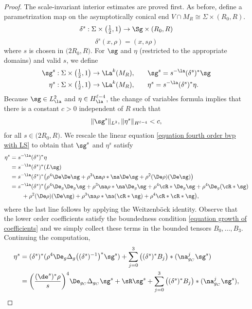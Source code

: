 \documentclass[hidelinks, 12pt, oneside, reqno]{amsart}
\begin{document}
\begin{proof}
    The scale-invariant interior estimates are proved first. As before, define a parametrization map on the asymptotically conical end $V \cap M_R \cong \Sigma \times (R_0, R)$.
    \[
    \delta^s : \Sigma \times \big(\tfrac12, 1\big) \rightarrow \Sg \times (R_0,R)
    \]
    \[
    \delta^s(x,\rho) = (x, s\rho)
    \]
    where $s$ is chosen in $\big(2R_0,R \big)$. For $\sg$ and $\eta$ (restricted to the appropriate domains) and valid $s$, we define
    \begin{align*}
        \sg^s : \Sigma \times \big(\tfrac12, 1 \big) \rightarrow \La^k(M_R), &\qquad \sg^s = s^{-\la}(\delta^s)^*\sg \\
        \eta^s :  \Sigma \times \big(\tfrac12, 1\big) \rightarrow \La^k(M_R), &\qquad \eta^s = s^{-\la}(\delta^s)^*\eta. 
    \end{align*}
    Because $\sg \in L^2_{\la}$ and $\eta \in H^{\ell-4}_{\la}$, the change of variables formula implies that there is a constant $c > 0$ independent of $R$ such that 
    \[
    \|\sg^s\|_{L^2}, \|\eta^s\|_{H^{\ell-4}} < c,
    \]
    for all $s \in \big(2R_0, R \big)$. We rescale the linear equation \eqref{equation fourth order bvp with LS} to obtain that $\sg^s$ and $\eta^s$ satisfy
    \begin{align*}
    \eta^s &= s^{-\la}(\delta^s)^*\eta \\ 
    &= s^{-\la}(\delta^s)^*(L\sg) \\
    &= s^{-\la}(\delta^s)^*\big(\rho^{4}\De \De \sg + \rho^{3} \na \rho * \na \De \sg + \rho^{2} (\De \rho )(\De \sg)\big) \\
    &= s^{-\la}(\delta^s)^*\big(\rho^{4}\De_g \De_g \sg + \rho^{3} \na \rho * \na \De_g \sg + \rho^4 \cR * \De_g \sg + \rho^4 \De_g (\cR * \sg) \\
    &\qquad + \rho^{2} (\De \rho )(\De \sg) + \rho^{3} \na \rho * \na (\cR * \sg) + \rho^4 \cR * \cR * \sg  \big),
    \end{align*}
    where the last line follows by applying the Weitzenb\"ock identity. Observe that the lower order coefficients satisfy the boundedness condition \eqref{equation growth of coefficients} and we simply collect these terms in the bounded tensors $B_0,\ldots,B_3$. Continuing the computation,
    \begin{align*}
    \eta^s &= (\delta^s)^* (\rho^4 \De_g \Delta_g \big((\delta^s)^{-1}\big)^*\sg^s) + \sum_{j=0}^3 \big((\delta^s)^*B_j\big) * (\na^j_{g_C} \sg^s) \\ 
    &= \bigg(\frac{(\de^s)^* \rho}{s}\bigg)^4\De_{g_C} \Delta_{g_C} \sg^s + \sR \sg^s + \sum_{j=0}^3 \big((\delta^s)^*B_j\big) * (\na^j_{g_C} \sg^s), 

\end{align*}
\end{proof}
\end{document}
